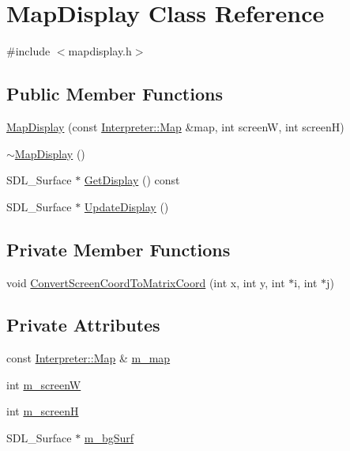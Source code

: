 \hypertarget{classMapDisplay}{
\section{MapDisplay Class Reference}
\label{classMapDisplay}
}


{\ttfamily \#include $<$mapdisplay.h$>$}

\subsection*{Public Member Functions}
\begin{DoxyCompactItemize}
\item 
\hyperlink{classMapDisplay_a3af0dfed1bf4e41a1fe810271593729d}{MapDisplay} (const \hyperlink{classMatrix}{Interpreter::Map} \&map, int screenW, int screenH)
\item 
\hyperlink{classMapDisplay_a95dc44c5a18970df2131eeb10b59cd21}{$\sim$MapDisplay} ()
\item 
SDL\_\-Surface $\ast$ \hyperlink{classMapDisplay_a346dbbf98f1ab76cddab55dfb9c07b27}{GetDisplay} () const 
\item 
SDL\_\-Surface $\ast$ \hyperlink{classMapDisplay_a1f8666a47c77fe1294af449e746430dc}{UpdateDisplay} ()
\end{DoxyCompactItemize}
\subsection*{Private Member Functions}
\begin{DoxyCompactItemize}
\item 
void \hyperlink{classMapDisplay_afd0ef9d9c11103bd966d27a12cd84ed7}{ConvertScreenCoordToMatrixCoord} (int x, int y, int $\ast$i, int $\ast$j)
\end{DoxyCompactItemize}
\subsection*{Private Attributes}
\begin{DoxyCompactItemize}
\item 
const \hyperlink{classMatrix}{Interpreter::Map} \& \hyperlink{classMapDisplay_a218c5b07ae7b9622a606faa613d7eaa9}{m\_\-map}
\item 
int \hyperlink{classMapDisplay_a31f9d5788c440d1ef0fca5729103ab05}{m\_\-screenW}
\item 
int \hyperlink{classMapDisplay_a3a6a2f7b6501945628fbfe022914daed}{m\_\-screenH}
\item 
SDL\_\-Surface $\ast$ \hyperlink{classMapDisplay_a8c4cc4b6d6a5f1608ca2a3eb9a5e3290}{m\_\-bgSurf}
\end{DoxyCompactItemize}


